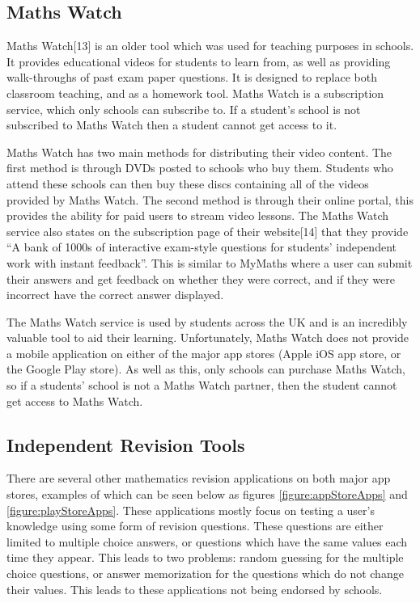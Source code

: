 \documentclass{article}
\begin{document}
\subsection{Maths Watch}

Maths Watch[13] is an older tool which was used for teaching purposes in schools. It provides educational videos for students to learn from, as well as providing walk-throughs of past exam paper questions. It is designed to replace both classroom teaching, and as a homework tool. Maths Watch is a subscription service, which only schools can subscribe to. If a student's school is not subscribed to Maths Watch then a student cannot get access to it. \par

Maths Watch has two main methods for distributing their video content. The first method is through DVDs posted to schools who buy them. Students who attend these schools can then buy these discs containing all of the videos provided by Maths Watch. The second method is through their online portal, this provides the ability for paid users to stream video lessons. The Maths Watch service also states on the subscription page of their website[14] that they provide ``A bank of 1000s of interactive exam-style questions for students' independent work with instant feedback''. This is similar to MyMaths where a user can submit their answers and get feedback on whether they were correct, and if they were incorrect have the correct answer displayed. \par

The Maths Watch service is used by students across the UK and is an incredibly valuable tool to aid their learning. Unfortunately, Maths Watch does not provide a mobile application on either of the major app stores (Apple iOS app store, or the Google Play store). As well as this, only schools can purchase Maths Watch, so if a students' school is not a Maths Watch partner, then the student cannot get access to Maths Watch. \par

\subsection{Independent Revision Tools}

There are several other mathematics revision applications on both major app stores, examples of which can be seen below as figures \ref{figure:appStoreApps} and \ref{figure:playStoreApps}. These applications mostly focus on testing a user's knowledge using some form of revision questions. These questions are either limited to multiple choice answers, or questions which have the same values each time they appear. This leads to two problems: random guessing for the multiple choice questions, or answer memorization for the questions which do not change their values. This leads to these applications not being endorsed by schools. \par
\end{document}
